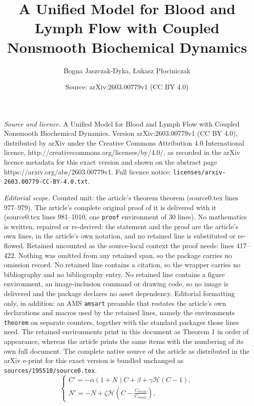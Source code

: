 \documentclass[10pt,a4paper]{amsart}
\title{A Unified Model for Blood and Lymph Flow with Coupled Nonsmooth Biochemical Dynamics}
\author{Bogna Jaszczak-Dyka, {\L}ukasz P{\l}ociniczak}
\date{Source: arXiv:2603.00779v1 (CC BY 4.0)}
\begin{document}
\maketitle

\noindent\emph{Source and licence.} A Unified Model for Blood and Lymph Flow with Coupled Nonsmooth Biochemical Dynamics. Version arXiv:2603.00779v1 (CC BY 4.0), distributed by arXiv under the Creative Commons Attribution 4.0 International licence, http://creativecommons.org/licenses/by/4.0/, as recorded in the arXiv licence metadata for this exact version and shown on the abstract page https://arxiv.org/abs/2603.00779v1. Full licence notice: \texttt{licenses/arxiv-2603.00779-CC-BY-4.0.txt}.\par\smallskip

\noindent\textit{Editorial scope.} Counted unit: the article's theorem theorem (source0.tex lines 977--979). The article's complete original proof of it is delivered with it (source0.tex lines 981--1010, one \texttt{proof} environment of 30 lines). No mathematics is written, repaired or re-derived: the statement and the proof are the article's own lines, in the article's own notation, and no retained line is substituted or re-flowed.  Retained uncounted as the source-local context the proof needs: lines 417--422.  Nothing was omitted from any retained span, so the package carries no omission record.  No retained line contains a citation, so the wrapper carries no bibliography and no bibliography entry.  No retained line contains a figure environment, an image-inclusion command or drawing code, so no image is delivered and the package declares no asset dependency.  Editorial formatting only, in addition: an AMS \texttt{amsart} preamble that restates the article's own declarations and macros used by the retained lines, namely the environments \texttt{theorem} on separate counters, together with the standard packages those lines need.  The retained environments print in this document as Theorem 1 in order of appearance, whereas the article prints the same items with the numbering of its own full document.  The complete native source of the article as distributed in the arXiv e-print for this exact version is bundled unchanged as \texttt{sources/195510/source0.tex}.
\begin{equation}\label{eq:alternative_scaling_system}
    \begin{cases}
        \displaystyle{C' = -\alpha (1+N) C + \beta + \gamma \mathcal{H}(C-1), }\\
        \displaystyle{N' = -N + \zeta \mathcal{H}\left(C-\frac{C_{tresh}}{C_{shear}}\right),}
    \end{cases}
\end{equation}
\end{document}
